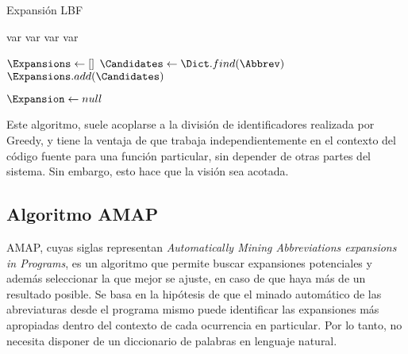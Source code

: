 \begin{algorithm}[H]
\caption{Expansión LBF}
\label{algLBF}
\DontPrintSemicolon
  
  
  \BlankLine
  var \WordList\;
  var \PhraseList\;
  var \StopList\;
  var \Dict\;
  
  \BlankLine
  \If{$\Abbrev \in \StopList$}{
    \KwRet \Abbrev\;
  }
  
  \BlankLine
  
  \BlankLine
  
  \BlankLine 
  $\Expansions \gets []$\;
  $\Candidates \gets \Dict.find(\Abbrev)$\;
  $\Expansions.add(\Candidates)$\;
  
  \BlankLine
  $\Expansion \gets null$\;
  
  \BlankLine
  \KwRet \Expansion\;

\end{algorithm}

Este algoritmo, suele acoplarse a la división de identificadores realizada por Greedy, y tiene la ventaja de que trabaja independientemente en el contexto del código fuente para una función particular, sin depender de otras partes del sistema.
Sin embargo, esto hace que la visión sea acotada.

\subsection{Algoritmo AMAP}
AMAP, cuyas siglas representan \textit{Automatically Mining Abbreviations expansions in Programs}, es un algoritmo que permite buscar expansiones potenciales y además seleccionar la que mejor se ajuste, en caso de que haya más de un resultado posible.
Se basa en la hipótesis de que el minado automático de las abreviaturas desde el programa mismo puede identificar las expansiones más apropiadas dentro del contexto de cada ocurrencia en particular.
Por lo tanto, no necesita disponer de un diccionario de palabras en lenguaje natural.

